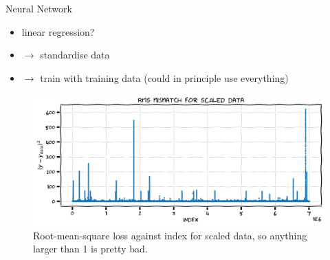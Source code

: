 \documentclass[xcolor=x11names,compress]{beamer}
\renewcommand{\(}{\begin{columns}}
\renewcommand{\)}{\end{columns}}
\newcommand{\<}[1]{\begin{column}{#1}}
\renewcommand{\>}{\end{column}}
\begin{document}

\begin{frame}{Neural Network}

\begin{itemize}
  \item linear regression?
  \item[] $\to$ standardise data
  \item[] $\to$ train with training data {\tiny (could in principle use everything)}
\end{itemize}

\begin{figure}
  \includegraphics[width=\textwidth]{argo_data_train_linreg_RMS}
  \caption{Root-mean-square loss against index for scaled data, so anything
  larger than 1 is pretty bad.}
\end{figure}

\end{frame}

\end{document}

